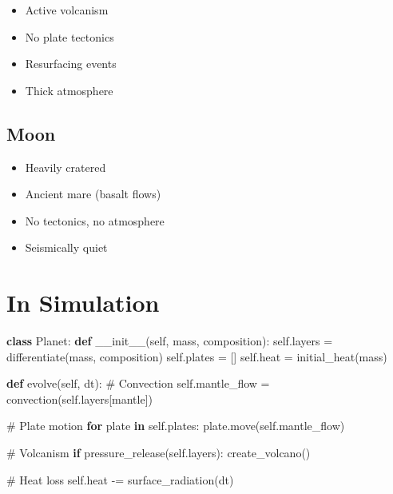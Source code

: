 \documentclass[
  11pt,
  letterpaper,
  twoside,
  openright]{book}
\newenvironment{Shaded}{\begin{snugshade}}{\end{snugshade}}
\newcommand{\CommentTok}[1]{\textcolor[rgb]{0.37,0.37,0.37}{#1}}
\newcommand{\ControlFlowTok}[1]{\textcolor[rgb]{0.00,0.23,0.31}{\textbf{#1}}}
\newcommand{\FunctionTok}[1]{\textcolor[rgb]{0.28,0.35,0.67}{#1}}
\newcommand{\KeywordTok}[1]{\textcolor[rgb]{0.00,0.23,0.31}{\textbf{#1}}}
\newcommand{\NormalTok}[1]{\textcolor[rgb]{0.00,0.23,0.31}{#1}}
\newcommand{\OperatorTok}[1]{\textcolor[rgb]{0.37,0.37,0.37}{#1}}
\newcommand{\StringTok}[1]{\textcolor[rgb]{0.13,0.47,0.30}{#1}}
\newcommand{\VariableTok}[1]{\textcolor[rgb]{0.07,0.07,0.07}{#1}}
\providecommand{\tightlist}{%
  \setlength{\itemsep}{0pt}\setlength{\parskip}{0pt}}
\begin{document}
\begin{itemize}
\tightlist
\item
  Active volcanism
\item
  No plate tectonics
\item
  Resurfacing events
\item
  Thick atmosphere
\end{itemize}

\subsection{Moon}\label{moon}

\begin{itemize}
\tightlist
\item
  Heavily cratered
\item
  Ancient mare (basalt flows)
\item
  No tectonics, no atmosphere
\item
  Seismically quiet
\end{itemize}

\section{In Simulation}\label{in-simulation-9}

\begin{Shaded}
\begin{Highlighting}[]
\KeywordTok{class}\NormalTok{ Planet:}
    \KeywordTok{def} \FunctionTok{\_\_init\_\_}\NormalTok{(}\VariableTok{self}\NormalTok{, mass, composition):}
        \VariableTok{self}\NormalTok{.layers }\OperatorTok{=}\NormalTok{ differentiate(mass, composition)}
        \VariableTok{self}\NormalTok{.plates }\OperatorTok{=}\NormalTok{ []}
        \VariableTok{self}\NormalTok{.heat }\OperatorTok{=}\NormalTok{ initial\_heat(mass)}

    \KeywordTok{def}\NormalTok{ evolve(}\VariableTok{self}\NormalTok{, dt):}
        \CommentTok{\# Convection}
        \VariableTok{self}\NormalTok{.mantle\_flow }\OperatorTok{=}\NormalTok{ convection(}\VariableTok{self}\NormalTok{.layers[}\StringTok{\textquotesingle{}mantle\textquotesingle{}}\NormalTok{])}

        \CommentTok{\# Plate motion}
        \ControlFlowTok{for}\NormalTok{ plate }\KeywordTok{in} \VariableTok{self}\NormalTok{.plates:}
\NormalTok{            plate.move(}\VariableTok{self}\NormalTok{.mantle\_flow)}

        \CommentTok{\# Volcanism}
        \ControlFlowTok{if}\NormalTok{ pressure\_release(}\VariableTok{self}\NormalTok{.layers):}
\NormalTok{            create\_volcano()}

        \CommentTok{\# Heat loss}
        \VariableTok{self}\NormalTok{.heat }\OperatorTok{{-}=}\NormalTok{ surface\_radiation(dt)}
\end{Highlighting}
\end{Shaded}
\end{document}
